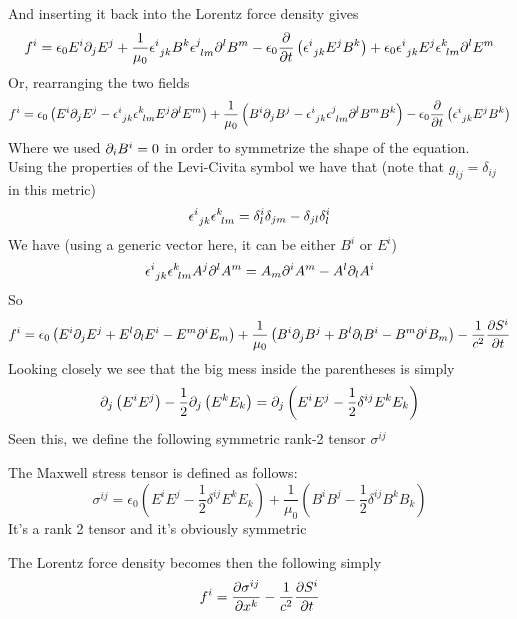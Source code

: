 \documentclass[../electromagnetism]{subfiles}
\begin{document}
And inserting it back into the Lorentz force density gives
\begin{equation}
	f^i=\epsilon_0E^i\partial_jE^j+\frac{1}{\mu_0}\epsilon^{i}_{\ jk}B^k\epsilon^{j}_{\ lm}\partial^lB^m-\epsilon_0\pdv{t}\left( \epsilon^{i}_{\ jk}E^jB^k \right)+\epsilon_0\epsilon^{i}_{\ jk}E^j\epsilon^{k}_{\ lm}\partial^lE^m
	\label{eq:forcedensitylorentz1}
\end{equation}
Or, rearranging the two fields
\begin{equation}
	f^i=\epsilon_0\left( E^i\partial_jE^j-\epsilon^{i}_{\ jk}\epsilon^{k}_{\ lm}E^j\partial^lE^m \right)+\frac{1}{\mu_0}\left( B^i\partial_jB^j-\epsilon^{i}_{\ jk}\epsilon^{j}_{\ lm}\partial^lB^mB^k \right)-\epsilon_0\pdv{t}\left( \epsilon^{i}_{\ jk}E^jB^k \right)
	\label{eq:lfdrearr}
\end{equation}
Where we used $\partial_iB^i=0$ in order to symmetrize the shape of the equation.\\
Using the properties of the Levi-Civita symbol we have that (note that $g_{ij}=\delta_{ij}$ in this metric)
\begin{equation}
	\epsilon^{i}_{\ jk}\epsilon^{k}_{\ lm}=\delta^i_l\delta_{jm}-\delta_{jl}\delta^i_l
	\label{eq:levicivitaproductrule}
\end{equation}
We have (using a generic vector here, it can be either $B^i$ or $E^i$)
\begin{equation*}
	\epsilon^{i}_{\ jk}\epsilon^{k}_{\ lm}A^j\partial^lA^m=A_m\partial^iA^m-A^l\partial_lA^i
\end{equation*}
So
\begin{equation*}
	f^i=\epsilon_0\left( E^i\partial_jE^j+E^l\partial_lE^i-E^m\partial^iE_m \right)+\frac{1}{\mu_0}\left( B^i\partial_jB^j+B^l\partial_lB^i-B^m\partial^iB_m \right)-\frac{1}{c^2}\pdv{S^i}{t}
\end{equation*}
Looking closely we see that the big mess inside the parentheses is simply
\begin{equation*}
	\partial_j\left( E^iE^j \right)-\frac{1}{2}\partial_j\left( E^kE_k \right)=\partial_j\left( E^iE^j-\frac{1}{2}\delta^{ij}E^kE_k \right)
\end{equation*}
Seen this, we define the following symmetric rank-2 tensor $\sigma^{ij}$
\begin{dfn}
	The Maxwell stress tensor is defined as follows:
	\begin{equation}
		\sigma^{ij}=\epsilon_0\left( E^iE^j-\frac{1}{2}\delta^{ij}E^kE_k \right)+\frac{1}{\mu_0}\left( B^iB^j-\frac{1}{2}\delta^{ij}B^kB_k \right)
	\end{equation}
	It's a rank 2 tensor and it's obviously symmetric 
\end{dfn}
The Lorentz force density becomes then the following simply
\begin{equation}
	f^i=\pdv{\sigma^{ij}}{x^k}-\frac{1}{c^2}\pdv{S^i}{t}
	\label{eq:lorentzforce}
\end{equation}
\end{document}
